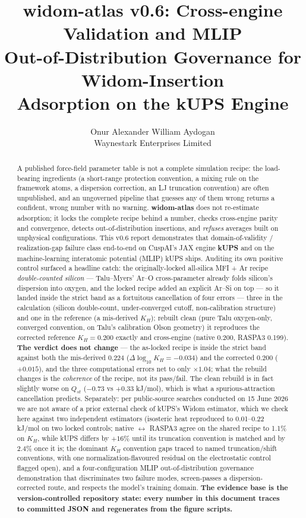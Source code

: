 \documentclass[11pt,a4paper]{article}
\title{widom-atlas v0.6: Cross-engine Validation and MLIP\\
Out-of-Distribution Governance for Widom-Insertion\\
Adsorption on the kUPS Engine}
\author{Onur Alexander William Aydogan\\
Waynestark Enterprises Limited}
\date{}
\begin{document}
\maketitle

\begin{abstract}
\noindent A published force-field parameter table is not a complete simulation recipe: the load-bearing
ingredients (a short-range protection convention, a mixing rule on the framework atoms, a dispersion
correction, an LJ truncation convention) are often unpublished, and an ungoverned pipeline that guesses
any of them wrong returns a confident, wrong number with no warning. \textbf{widom-atlas} does not
re-estimate adsorption; it locks the complete recipe behind a number, checks cross-engine parity and
convergence, detects out-of-distribution insertions, and \emph{refuses} averages built on unphysical
configurations. This v0.6 report demonstrates that domain-of-validity / realization-gap failure class
end-to-end on CuspAI's JAX engine \textbf{kUPS} and on the machine-learning interatomic potential
(MLIP) kUPS ships. Auditing its own positive control surfaced a headline catch: the originally-locked
all-silica MFI + Ar recipe \emph{double-counted silicon} --- Talu--Myers' Ar--O cross-parameter already
folds silicon's dispersion into oxygen, and the locked recipe added an explicit Ar--Si on top --- so it
landed inside the strict band as a fortuitous cancellation of four errors --- three in the calculation
(silicon double-count, under-converged cutoff, non-calibration structure) and one in the reference
(a mis-derived $K_H$); rebuilt clean (pure Talu oxygen-only,
converged convention, on Talu's calibration Olson geometry) it reproduces the corrected reference
$K_H = 0.200$ exactly and cross-engine (native 0.200, RASPA3 0.199). \textbf{The verdict does not
change} --- the as-locked recipe is inside the strict band against both the mis-derived 0.224
($\Delta\log_{10}K_H = -0.034$) and the corrected 0.200 ($+0.015$), and the three computational errors
net to only $\times1.04$; what the rebuild changes is the \emph{coherence} of the recipe, not its
pass/fail. The clean rebuild is in fact slightly worse on $Q_{st}$ ($-0.73$ vs $+0.33$ kJ/mol), which is
what a spurious-attraction cancellation predicts. Separately: per public-source searches conducted on
15 June 2026 we are not aware of a prior external check of kUPS's Widom estimator, which we check here
against two independent estimators (isosteric
heat reproduced to 0.01--0.22 kJ/mol on two locked controls; native $\leftrightarrow$ RASPA3 agree on the
shared recipe to 1.1\% on $K_H$, while kUPS differs by $+16$\% until its truncation convention is matched
and by 2.4\% once it is; the dominant $K_H$ convention gaps traced to named truncation/shift
conventions, with one normalization-flavoured residual on the electrostatic control flagged open), and a
four-configuration MLIP out-of-distribution governance demonstration that discriminates two failure
modes, screen-passes a dispersion-corrected route, and respects the model's training domain. \textbf{The
evidence base is the version-controlled repository state: every number in this document traces to
committed JSON and regenerates from the figure scripts.}
\end{abstract}
\end{document}
